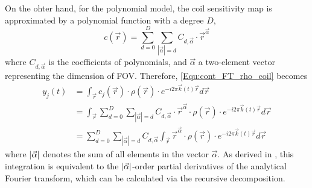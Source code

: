 On the ohter hand, for the polynomial model, the coil sensitivity map is approximated by a polynomial function with a degree $D$,
\begin{equation} \label{Equ:coil_poly}
  c(\vec{r}) = \sum_{d=0}^{D} \sum_{|\vec{\alpha}|=d} C_{d,\vec{\alpha}} \cdot \vec{r}^{\vec{\alpha}}
\end{equation}
where $C_{d,\vec{\alpha}}$ is the coefficients of polynomials, and $\vec{\alpha}$ a two-element vector representing the dimension of FOV. Therefore, \cref{Equ:cont_FT_rho_coil} becomes
\begin{equation} \label{Equ:cont_FT_rho_poly_coil}
\begin{aligned}
  y_j(t) 
  & = \int_{\vec{r}} c_j(\vec{r}) \cdot \rho(\vec{r}) \cdot e^{-i 2\pi \vec{k}(t) \vec{r}} d\vec{r} \\
  & = \int_{\vec{r}} \sum_{d=0}^D \sum_{|\vec{\alpha}|=d} C_{d,\vec{\alpha}} \cdot \vec{r}^{\vec{\alpha}} \cdot \rho(\vec{r}) \cdot e^{-i 2\pi \vec{k}(t) \vec{r}} d\vec{r} \\
  & = \sum_{d=0}^D \sum_{|\vec{\alpha}|=d} C_{d,\vec{\alpha}} \int_{\vec{r}} \vec{r}^{\vec{\alpha}} \cdot \rho(\vec{r}) \cdot e^{-i 2\pi \vec{k}(t) \vec{r}} d\vec{r}
\end{aligned}
\end{equation}
where $\lvert\vec{\alpha}\rvert$ denotes the sum of all elements in the vector $\vec{\alpha}$. As derived in \cite{2012_analSim}, this integration is equivalent to the $\lvert\vec{\alpha}\rvert$-order partial derivatives of the analytical Fourier transform, which can be calculated via the recursive decomposition. 



